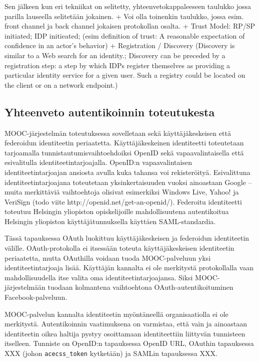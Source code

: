 \documentclass[finnish,gradu]{tktltiki}
\begin{document}
    Sen jälkeen kun eri tekniikat on selitetty, yhteenvetokappaleeseen taulukko jossa parilla lauseella selitetään jokainen.
    + Voi olla toinenkin taulukko, jossa esim. front channel ja back channel jokaisen protokollan osalta.
    + Trust Model: RP/SP initiated; IDP initieated; (esim definition of trust: A reasonable expectation of confidence in an actor’s behavior)
    + Registration / Discovery (Discovery is similar to a Web search for an identity.; Discovery can be preceded by a registration step: a step by which IDPs register themselves as providing a particular identity service for a given user. Such a registry could be located on the client or on a network endpoint.)


  \subsection{Yhteenveto autentikoinnin toteutukesta} %
  \label{sub:yhteenveto_autentikoinnin_toteutukesta}

  MOOC-järjestelmän toteutuksessa sovelletaan sekä käyttäjäkeskeisen että federoidun identiteetin periaatetta. Käyttäjäkeskeinen identiteetti toteutetaan tarjoamalla tunnistautumisvaihtoehdoiksi OpenID sekä vapaavalintaisella että esivalitulla identiteetintarjoajalla. OpenID:n vapaavalintaisen identiteetintarjoajan ansiosta avulla kuka tahansa voi rekisteröityä. Esivalittuna identiteetintarjoajana toteutetaan yksinkertaisuuden vuoksi ainoastaan Google -- muita merkittäviä vaihtoehtoja olisivat esimerkiksi Windows Live, Yahoo! ja VeriSign (todo viite http://openid.net/get-an-openid/). Federoitu identiteetti toteutuu Helsingin yliopiston opiskelijoille mahdollisuutena autentikoitua Helsingin yliopiston käyttäjätunnuksella käyttäen SAML-standardia.

  Tässä tapauksessa OAuth luokittuu käyttäjäkeskeisen ja federoidun identiteetin välille. OAuth-protokolla ei itsessään toteuta käyttäjäkeskeisen identiteetin periaatetta, mutta OAuthilla voidaan tuoda MOOC-palveluun yksi identiteetintarjoaja lisää. Käyttäjän kannalta ei ole merkitystä protokollalla vaan mahdollisuudella itse valita oma identiteetintarjoajansa. Siksi MOOC-järjestelmään tuodaan kolmantena vaihtoehtona OAuth-autentikoituminen Facebook-palveluun.

  MOOC-palvelun kannalta identiteetin myöntäneellä organisaatiolla ei ole merkitystä. Autentikoinnin vaatimuksena on varmistaa, että vain ja ainoastaan identiteetin oikea haltija pystyy osoittamaan identiteettiin liittyvän tunnisteen itselleen. Tunniste on OpenID:n tapauksessa OpenID URL, OAuthin tapauksessa XXX (johon \verb#acecss_token# kytketään) ja SAMLin tapauksessa XXX.
\end{document}
